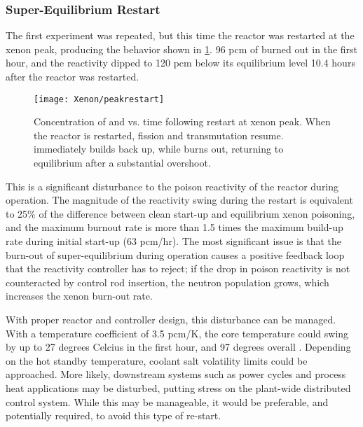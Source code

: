 \subsubsection{Super-Equilibrium Restart}
The first experiment was repeated, but this time the reactor was restarted at the xenon peak, producing the behavior shown in \cref{fig:PeakRestart}. 96 pcm of \Xe burned out in the first hour, and the \Xe reactivity dipped to 120 pcm below its equilibrium level 10.4 hours after the reactor was restarted. 

\begin{figure}[ht!]
    \centering
    \texttt{[image: Xenon/peakrestart]}
    \caption[Concentration of \I and \Xe vs. time following restart at xenon peak]{Concentration of \I and \Xe vs. time following restart at xenon peak. When the reactor is restarted, fission and transmutation resume. \I immediately builds back up, while \Xe burns out, returning to equilibrium after a substantial overshoot.}
    \label{fig:PeakRestart}
\end{figure}

This is a significant disturbance to the poison reactivity of the reactor during operation. The magnitude of the reactivity swing during the restart is equivalent to 25\% of the difference between clean start-up and equilibrium xenon poisoning, and the maximum burnout rate is more than 1.5 times the maximum \Xe build-up rate during initial start-up (63 pcm/hr). The most significant issue is that the burn-out of super-equilibrium \Xe during operation causes a positive feedback loop that the reactivity controller has to reject; if the drop in poison reactivity is not counteracted by control rod insertion, the neutron population grows, which increases the xenon burn-out rate.

With proper reactor and controller design, this disturbance can be managed. With a temperature coefficient of 3.5 pcm/K, the core temperature could swing by up to 27 degrees Celcius in the first hour, and 97 degrees overall \cite{CarterMCNP}. Depending on the hot standby temperature, coolant salt volatility limits could be approached. More likely, downstream systems such as power cycles and process heat applications may be disturbed, putting stress on the plant-wide distributed control system. While this may be manageable, it would be preferable, and potentially required, to avoid this type of re-start.

